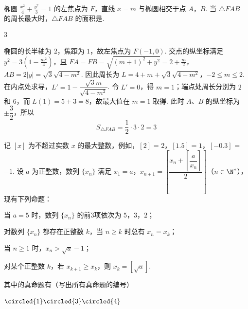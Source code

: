 \begin{problem}
椭圆 \(\frac{x^2}{4} + \frac{y^2}{3} = 1\) 的左焦点为 \(F\)，直线 \(x = m\) 与椭圆相交于点 \(A\)，\(B\). 当 \(\triangle FAB\) 的周长最大时，\(\triangle FAB\) 的面积是\fillinblank{}.
\end{problem}

\begin{answer}
\(3\)
\end{answer}

\begin{solution}
椭圆的长半轴为 \(2\)，焦距为 \(1\)，故左焦点为 \(F(-1,0)\). 交点的纵坐标满足
\(y^2=3(1-\frac{m^2}{4})\)，且
\(FA=FB=\sqrt{(m+1)^2+y^2}=2+\frac m2\)，\(AB=2|y|=\sqrt3\sqrt{4-m^2}\).
因此周长为
\(L=4+m+\sqrt3\sqrt{4-m^2}\)，\(-2\leqslant m\leqslant2\).
在内点处求导，\(L'=1-\dfrac{\sqrt3m}{\sqrt{4-m^2}}\). 令 \(L'=0\)，得 \(m=1\)；端点处周长分别为 \(2\) 和 \(6\)，而 \(L(1)=5+3=8\)，故最大值在 \(m=1\) 取得. 此时 \(A\)、\(B\) 的纵坐标为 \(\pm\dfrac32\)，所以
\[
S_{\triangle FAB}=\frac12\cdot3\cdot2=3
\]
\end{solution}

\begin{problem}
记 \([x]\) 为不超过实数 \(x\) 的最大整数，例如，\([2]\) = \(2\)，\([1.5]\) = \(1\)，\([{-0.3}]\) = \(-1\). 设 \(a\) 为正整数，数列 \(\{x_n\}\) 满足 \(x_1 = a\)，\(x_{n+1} = \left[\dfrac{x_n + \left[\dfrac{a}{x_n}\right]}{2}\right]\)（\(n \in \N^*\)），现有下列命题：

\begin{circlelist}
\item 当 \(a=5\) 时，数列 \(\{x_n\}\) 的前3项依次为 \(5\)，\(3\)，\(2\)；
\item 对数列 \(\{x_n\}\) 都存在正整数 \(k\)，当 \(n\geqslant k\) 时总有 \(x_n=x_k\)；
\item 当 \(n\geqslant1\) 时，\(x_n>\sqrt a-1\)；
\item 对某个正整数 \(k\)，若 \(x_{k+1}\geqslant x_k\)，则 \(x_k=[\sqrt a]\).
\end{circlelist}

其中的真命题有\fillinblank{}（写出所有真命题的编号）
\end{problem}

\begin{answer}
\(\circled{1}\circled{3}\circled{4}\)
\end{answer}


